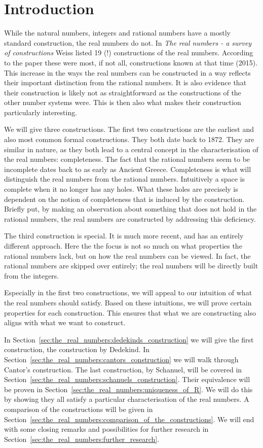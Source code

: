 \documentclass[../main.tex]{subfiles}
\begin{document}
\section*{Introduction}
While the natural numbers, integers and rational numbers have a mostly standard construction, the real numbers do not. In \textit{The real numbers - a survey of constructions} \cite{Weiss2015} Weiss listed 19 (!) constructions of the real numbers. According to the paper these were most, if not all, constructions known at that time (2015). This increase in the ways the real numbers can be constructed in a way reflects their important distinction from the rational numbers. It is also evidence that their construction is likely not as straightforward as the constructions of the other number systems were. This is then also what makes their construction particularly interesting.

We will give three constructions. The first two constructions are the earliest and also most common formal constructions. They both date back to 1872. They are similar in nature, as they both lead to a central concept in the characterisation of the real numbers: completeness. The fact that the rational numbers seem to be incomplete dates back to as early as Ancient Greece. Completeness is what will distinguish the real numbers from the rational numbers. Intuitively a space is complete when it no longer has any holes. What these holes are precisely is dependent on the notion of completeness that is induced by the construction. Briefly put, by making an observation about something that does not hold in the rational numbers, the real numbers are constructed by addressing this deficiency.

The third construction is special. It is much more recent, and has an entirely different approach. Here the the focus is not so much on what properties the rational numbers lack, but on how the real numbers can be viewed. In fact, the rational numbers are skipped over entirely; the real numbers will be directly built from the integers.

Especially in the first two constructions, we will appeal to our intuition of what the real numbers should satisfy. Based on these intuitions, we will prove certain properties for each construction. This ensures that what we are constructing also aligns with what we want to construct.

In Section~\ref{sec:the_real_numbers:dedekinds_construction} we will give the first construction, the construction by Dede\-kind. In Section~\ref{sec:the_real_numbers:cantors_construction} we will walk through Cantor's construction. The last construction, by Schanuel, will be covered in Section~\ref{sec:the_real_numbers:schanuels_construction}. Their equivalence will be proven in Section~\ref{sec:the_real_numbers:uniqueness_of_R}. We will do this by showing they all satisfy a particular characterisation of the real numbers. A comparison of the constructions will be given in Section~\ref{sec:the_real_numbers:comparison_of_the_constructions}. We will end with some closing remarks and possibilities for further research in Section~\ref{sec:the_real_numbers:further_research}.
\end{document}
